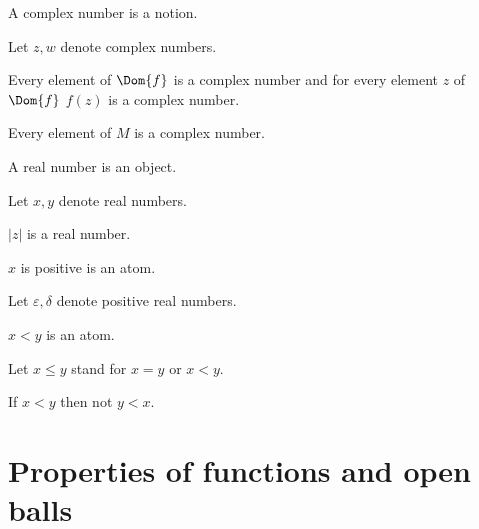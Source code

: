 \documentclass{article}
\begin{document}
  \begin{forthel}
    \begin{signature}
      A complex number is a notion.
    \end{signature}

    Let $z, w$ denote complex numbers.

    \begin{axiom}
      Every element of $\Dom{f}$ is a complex number and for every element $z$ of $\Dom{f}$ $f(z)$ is a complex number.
    \end{axiom}

    \begin{axiom}
      Every element of $M$ is a complex number.
    \end{axiom}

    \begin{signature}
      A real number is an object.
    \end{signature}

    Let $x,y$ denote real numbers.

    \begin{signature}
      $|z|$ is a real number.
    \end{signature}

    \begin{signature}
      $x$ is positive is an atom.
    \end{signature}

    Let $\varepsilon, \delta$ denote positive real numbers.

    \begin{signature}
      $x < y$ is an atom.
    \end{signature}

    Let $x \leq y$ stand for $x = y$ or $x < y$.

    \begin{axiom}
      If $x < y$ then not $y < x$.
    \end{axiom}
  \end{forthel}

  \section{Properties of functions and open balls}
\end{document}
